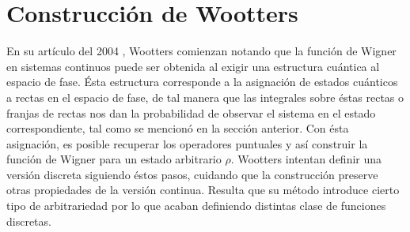 \documentclass[a4paper]{report}
\DeclareMathOperator{\Z}{\mathbb{Z}}
\begin{document}




  \section{Construcción de Wootters}

  En su artículo del 2004 \cite{gibbons2004}, Wootters
  comienzan notando que la función de Wigner en sistemas
  continuos puede ser obtenida al exigir una estructura
  cuántica al espacio de fase. Ésta estructura corresponde a
  la asignación de estados cuánticos a rectas en el espacio
  de fase, de tal manera que las integrales sobre éstas
  rectas o franjas de rectas nos dan la probabilidad de
  observar el sistema en el estado correspondiente, tal como
  se mencionó en la sección anterior. Con ésta asignación,
  es posible recuperar los operadores puntuales y así
  construir la función de Wigner para un estado arbitrario
  $\rho$.  Wootters intentan definir una versión discreta
  siguiendo éstos pasos, cuidando que la construcción
  preserve otras propiedades de la versión continua.
  Resulta que su método introduce cierto tipo de
  arbitrariedad por lo que acaban definiendo distintas clase
  de funciones discretas.
\end{document}
